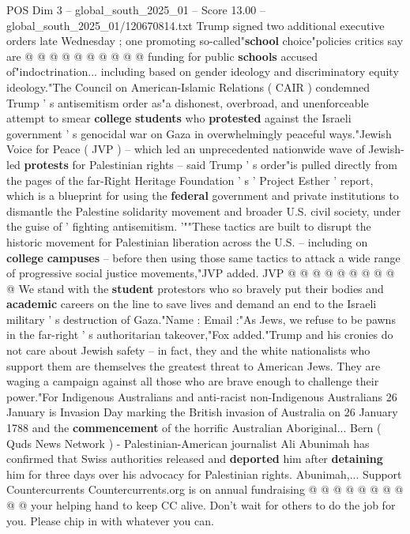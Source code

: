 \begin{textsample}{POS Dim 3 – global\_south\_2025\_01 – Score 13.00 – global\_south\_2025\_01/120670814.txt}
Trump signed two additional executive orders late Wednesday ; one promoting so-called"\textbf{school} choice"policies critics say are @ @ @ @ @ @ @ @ @ @ funding for public \textbf{schools} accused of"indoctrination... including based on gender ideology and discriminatory equity ideology."The Council on American-Islamic Relations ( CAIR ) condemned Trump ' s antisemitism order as"a dishonest, overbroad, and unenforceable attempt to smear \textbf{college} \textbf{students} who \textbf{protested} against the Israeli government ' s genocidal war on Gaza in overwhelmingly peaceful ways."Jewish Voice for Peace ( JVP ) -- which led an unprecedented nationwide wave of Jewish-led \textbf{protests} for Palestinian rights -- said Trump ' s order"is pulled directly from the pages of the far-Right Heritage Foundation ' s ' Project Esther ' report, which is a blueprint for using the \textbf{federal} government and private institutions to dismantle the Palestine solidarity movement and broader U.S. civil society, under the guise of ' fighting antisemitism. '""These tactics are built to disrupt the historic movement for Palestinian liberation across the U.S. -- including on \textbf{college} \textbf{campuses} -- before then using those same tactics to attack a wide range of progressive social justice movements,"JVP added.
JVP @ @ @ @ @ @ @ @ @ @ We stand with the \textbf{student} protestors who so bravely put their bodies and \textbf{academic} careers on the line to save lives and demand an end to the Israeli military ' s destruction of Gaza."Name : Email :"As Jews, we refuse to be pawns in the far-right ' s authoritarian takeover,"Fox added."Trump and his cronies do not care about Jewish safety -- in fact, they and the white nationalists who support them are themselves the greatest threat to American Jews.
They are waging a campaign against all those who are brave enough to challenge their power."For Indigenous Australians and anti-racist non-Indigenous Australians 26 January is Invasion Day marking the British invasion of Australia on 26 January 1788 and the \textbf{commencement} of the horrific Australian Aboriginal...
Bern ( Quds News Network ) - Palestinian-American journalist Ali Abunimah has confirmed that Swiss authorities released and \textbf{deported} him after \textbf{detaining} him for three days over his advocacy for Palestinian rights.
Abunimah,...
Support Countercurrents Countercurrents.org is on annual fundraising @ @ @ @ @ @ @ @ @ @ your helping hand to keep CC alive.
Don't wait for others to do the job for you.
Please chip in with whatever you can.

\end{textsample}
